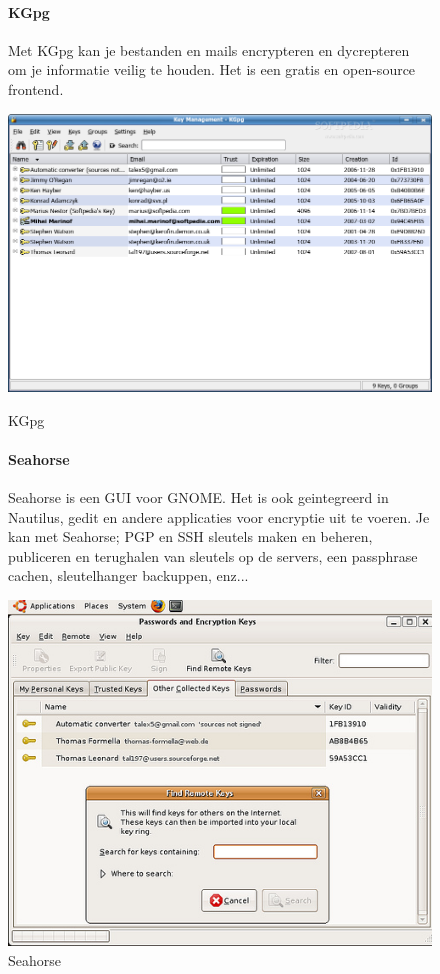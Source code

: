 \documentclass[12pt]{article}
\begin{document}
				\begin{figure}[!ht]				
					\paragraph{KGpg}
						Met KGpg kan je bestanden en mails encrypteren en dycrepteren om je 									informatie veilig te houden.
						Het is een gratis en open-source frontend.
					\begin{center}
						\includegraphics[scale=0.2]{Pictures/kgpg}
					\end{center}
					\caption{KGpg}
				
					\paragraph{Seahorse}
						Seahorse is een GUI voor GNOME. Het is ook geintegreerd in Nautilus, gedit 								en andere applicaties voor encryptie uit te voeren.
						Je kan met Seahorse; PGP en SSH sleutels maken en beheren, publiceren en 								terughalen van sleutels op de servers, een passphrase cachen, 											sleutelhanger backuppen, enz...
					\begin{center}
						\includegraphics[scale=0.4]{Pictures/Seahorse}
					\end{center}
					\caption{Seahorse}
				\end{figure}
				
\end{document}
